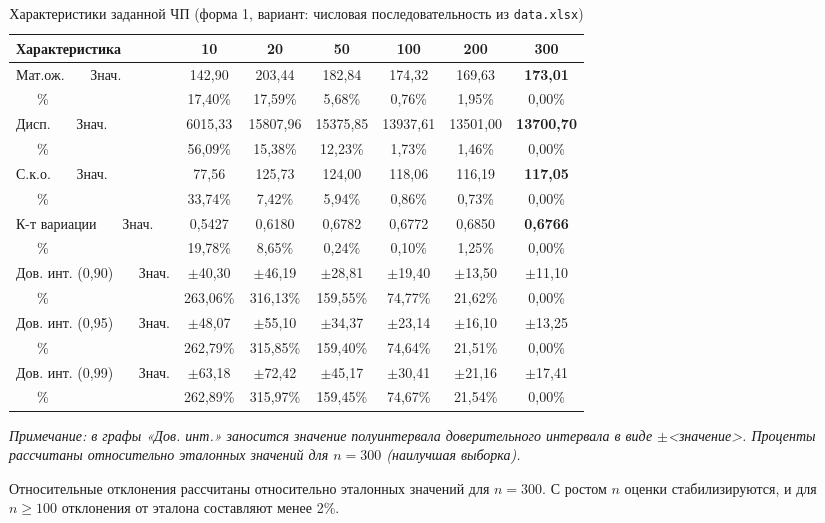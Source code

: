 \documentclass[a4paper,12pt]{article}
\begin{document}
\begin{table}[H]
\centering
\small
\caption{Характеристики заданной ЧП (форма 1, вариант: числовая последовательность из \texttt{data.xlsx})}
\label{tab:form1}
\begin{tabular}{l|cccccc}
\toprule
\textbf{Характеристика} & \textbf{10} & \textbf{20} & \textbf{50} & \textbf{100} & \textbf{200} & \textbf{300} \\
\midrule
Мат.ож. \ \ \ Знач. & 142,90 & 203,44 & 182,84 & 174,32 & 169,63 & \textbf{173,01} \\
\ \ \ \% & 17,40\% & 17,59\% & 5,68\% & 0,76\% & 1,95\% & 0,00\% \\
Дисп. \ \ \ Знач. & 6015,33 & 15807,96 & 15375,85 & 13937,61 & 13501,00 & \textbf{13700,70} \\
\ \ \ \% & 56,09\% & 15,38\% & 12,23\% & 1,73\% & 1,46\% & 0,00\% \\
С.к.о. \ \ \ Знач. & 77,56 & 125,73 & 124,00 & 118,06 & 116,19 & \textbf{117,05} \\
\ \ \ \% & 33,74\% & 7,42\% & 5,94\% & 0,86\% & 0,73\% & 0,00\% \\
К-т вариации \ \ \ Знач. & 0,5427 & 0,6180 & 0,6782 & 0,6772 & 0,6850 & \textbf{0,6766} \\
\ \ \ \% & 19,78\% & 8,65\% & 0,24\% & 0,10\% & 1,25\% & 0,00\% \\
\midrule
Дов. инт. (0,90) \ \ \ Знач. & $\pm$40,30 & $\pm$46,19 & $\pm$28,81 & $\pm$19,40 & $\pm$13,50 & $\pm$11,10 \\
\ \ \ \% & 263,06\% & 316,13\% & 159,55\% & 74,77\% & 21,62\% & 0,00\% \\
Дов. инт. (0,95) \ \ \ Знач. & $\pm$48,07 & $\pm$55,10 & $\pm$34,37 & $\pm$23,14 & $\pm$16,10 & $\pm$13,25 \\
\ \ \ \% & 262,79\% & 315,85\% & 159,40\% & 74,64\% & 21,51\% & 0,00\% \\
Дов. инт. (0,99) \ \ \ Знач. & $\pm$63,18 & $\pm$72,42 & $\pm$45,17 & $\pm$30,41 & $\pm$21,16 & $\pm$17,41 \\
\ \ \ \% & 262,89\% & 315,97\% & 159,45\% & 74,67\% & 21,54\% & 0,00\% \\
\bottomrule
\end{tabular}
\end{table}

\textit{Примечание: в графы «Дов. инт.» заносится значение полуинтервала доверительного интервала в виде $\pm$<значение>. Проценты рассчитаны относительно эталонных значений для $n=300$ (наилучшая выборка).}

Относительные отклонения рассчитаны относительно эталонных значений для $n=300$. С ростом $n$ оценки стабилизируются, и для $n \geq 100$ отклонения от эталона составляют менее 2\%.
\end{document}

